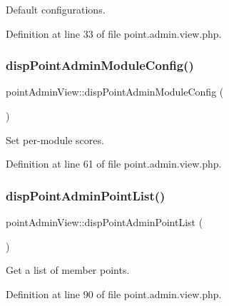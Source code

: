 Default configurations. 



Definition at line 33 of file point.\+admin.\+view.\+php.

\hypertarget{classpointAdminView_a3f1014ab2fef5e38542e6e38a921bc6e}{}\label{classpointAdminView_a3f1014ab2fef5e38542e6e38a921bc6e} 
\subsubsection{\texorpdfstring{disp\+Point\+Admin\+Module\+Config()}{dispPointAdminModuleConfig()}}
{\footnotesize\ttfamily point\+Admin\+View\+::disp\+Point\+Admin\+Module\+Config (\begin{DoxyParamCaption}{ }\end{DoxyParamCaption})}



Set per-\/module scores. 



Definition at line 61 of file point.\+admin.\+view.\+php.

\hypertarget{classpointAdminView_af4d324fe8612263a3fa6183bf06a5053}{}\label{classpointAdminView_af4d324fe8612263a3fa6183bf06a5053} 
\subsubsection{\texorpdfstring{disp\+Point\+Admin\+Point\+List()}{dispPointAdminPointList()}}
{\footnotesize\ttfamily point\+Admin\+View\+::disp\+Point\+Admin\+Point\+List (\begin{DoxyParamCaption}{ }\end{DoxyParamCaption})}



Get a list of member points. 



Definition at line 90 of file point.\+admin.\+view.\+php.

\hypertarget{classpointAdminView_a0e6e7f367fbb84b3f4e6f95e838c2b50}{}\label{classpointAdminView_a0e6e7f367fbb84b3f4e6f95e838c2b50} 
